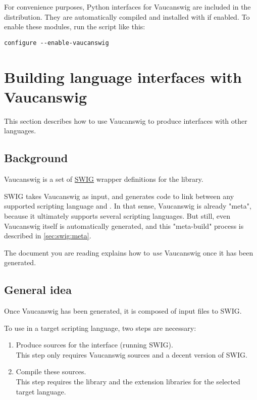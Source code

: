 For convenience purposes, Python interfaces for Vaucanswig are
included in the distribution.  They are automatically compiled and
installed with \Vauc if enabled.  To enable these modules, run the
 script like this:

\begin{lstlisting}
configure --enable-vaucanswig
\end{lstlisting}

\section{Building language interfaces with Vaucanswig}
\label{sec:swig:build}

This section describes how to use Vaucanswig to produce interfaces
with other languages.

\subsection{Background}

Vaucanswig is a set of \href{http://www.swig.org}{SWIG} wrapper
definitions for the \Vauc library.

SWIG takes Vaucanswig as input, and generates code to link between any
supported scripting language and \Cxx. In that sense, Vaucanswig is
already "meta", because it ultimately supports several scripting
languages. But still, even Vaucanswig itself is automatically
generated, and this "meta-build" process is described in
\autoref{sec:swig:meta}.

The document you are reading explains how to \emph{use} Vaucanswig once it
has been generated.


\subsection{General idea}

Once Vaucanswig has been generated, it is composed of input files to
SWIG.

To use \Vauc in a target scripting language, two steps are necessary:

\begin{enumerate}
\item Produce \Cxx sources for the interface (running SWIG).\\
  This step only requires Vaucanswig sources and a decent version of
  SWIG.
\item Compile these sources.\\
  This step requires the \Vauc library and the extension libraries
  for the selected target language.
\end{enumerate}

